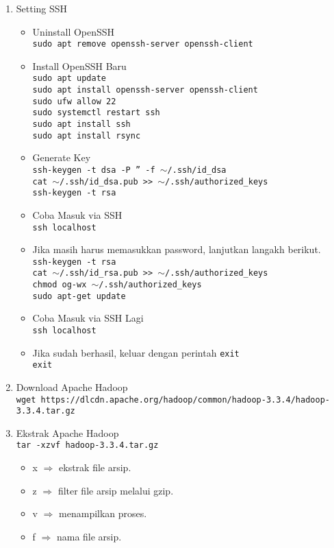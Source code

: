 \documentclass[a4paper]{tufte-handout}
\begin{document}
\begin{enumerate}
\item Setting SSH \\
\begin{itemize}
\item Uninstall OpenSSH \\
{\tt sudo apt remove openssh-server openssh-client}
\item Install OpenSSH Baru \\
{\tt sudo apt update} \\
{\tt sudo apt install openssh-server openssh-client} \\
{\tt sudo ufw allow 22} \\
{\tt sudo systemctl restart ssh} \\
{\tt sudo apt install ssh} \\
{\tt sudo apt install rsync}
\item Generate Key \\
{\tt ssh-keygen -t dsa -P '' -f $\sim$/.ssh/id\_dsa} \\
{\tt cat $\sim$/.ssh/id\_dsa.pub >> $\sim$/.ssh/authorized\_keys} \\
{\tt ssh-keygen -t rsa}
\item Coba Masuk via SSH \\
{\tt ssh localhost}
\item Jika masih harus memasukkan password, lanjutkan langakh berikut. \\
{\tt ssh-keygen -t rsa} \\
{\tt cat $\sim$/.ssh/id\_rsa.pub >> $\sim$/.ssh/authorized\_keys} \\
{\tt chmod og-wx $\sim$/.ssh/authorized\_keys} \\
{\tt sudo apt-get update}
\item Coba Masuk via SSH Lagi \\
{\tt ssh localhost}
\item Jika sudah berhasil, keluar dengan perintah {\tt exit} \\
{\tt exit}
\end{itemize}

\item Download Apache Hadoop \\
{\tt wget https://dlcdn.apache.org/hadoop/common/hadoop-3.3.4/hadoop-3.3.4.tar.gz}

\item Ekstrak Apache Hadoop \\
{\tt tar -xzvf hadoop-3.3.4.tar.gz }
\begin{itemize}
\item x $\Rightarrow$ ekstrak file arsip.
\item z $\Rightarrow$ filter file arsip melalui gzip.
\item v $\Rightarrow$ menampilkan proses.
\item f $\Rightarrow$ nama file arsip.
\end{itemize}


\end{enumerate}
\end{document}

